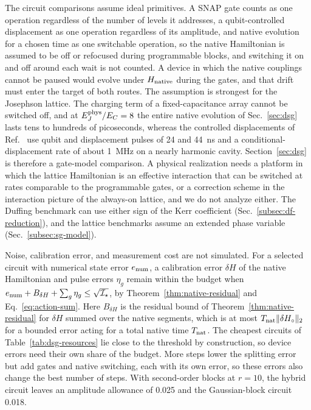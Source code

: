 \documentclass[pra,twocolumn,superscriptaddress,nofootinbib,floatfix]{revtex4-2}
\theoremstyle{remark}
\begin{document}
The circuit comparisons assume ideal primitives. A SNAP gate counts as one operation regardless of the number of levels it addresses, a qubit-controlled displacement as one operation regardless of its amplitude, and native evolution for a chosen time as one switchable operation, so the native Hamiltonian is assumed to be off or refocused during programmable blocks, and switching it on and off around each wait is not counted. A device in which the native couplings cannot be paused would evolve under \(H_{\rm native}\) during the gates, and that drift must enter the target of both routes. The assumption is strongest for the Josephson lattice. The charging term of a fixed-capacitance array cannot be switched off, and at \(E_J^{\rm phys}/E_C=8\) the entire native evolution of Sec.~\ref{sec:dsg} lasts tens to hundreds of picoseconds, whereas the controlled displacements of Ref.~\cite{Eickbusch2022ECD} use qubit and displacement pulses of 24 and 44~ns and a conditional-displacement rate of about 1~MHz on a nearly harmonic cavity. Section~\ref{sec:dsg} is therefore a gate-model comparison. A physical realization needs a platform in which the lattice Hamiltonian is an effective interaction that can be switched at rates comparable to the programmable gates, or a correction scheme in the interaction picture of the always-on lattice, and we do not analyze either. The Duffing benchmark can use either sign of the Kerr coefficient (Sec.~\ref{subsec:df-reduction}), and the lattice benchmarks assume an extended phase variable (Sec.~\ref{subsec:sg-model}).

Noise, calibration error, and measurement cost are not simulated. For a selected circuit with numerical state error \(e_{\rm num}\), a calibration error \(\delta H\) of the native Hamiltonian and pulse errors \(\eta_g\) remain within the budget when \(e_{\rm num}+B_{\delta H}+\sum_g\eta_g\le\sqrt{\mathcal I_\star}\), by Theorem~\ref{thm:native-residual} and Eq.~\eqref{eq:action-sum}. Here \(B_{\delta H}\) is the residual bound of Theorem~\ref{thm:native-residual} for \(\delta H\) summed over the native segments, which is at most \(T_{\rm nat}\|\delta H_\circ\|_2\) for a bounded error acting for a total native time \(T_{\rm nat}\). The cheapest circuits of Table~\ref{tab:dsg-resources} lie close to the threshold by construction, so device errors need their own share of the budget. More steps lower the splitting error but add gates and native switching, each with its own error, so these errors also change the best number of steps. With second-order blocks at \(r=10\), the hybrid circuit leaves an amplitude allowance of 0.025 and the Gaussian-block circuit 0.018.
\end{document}
